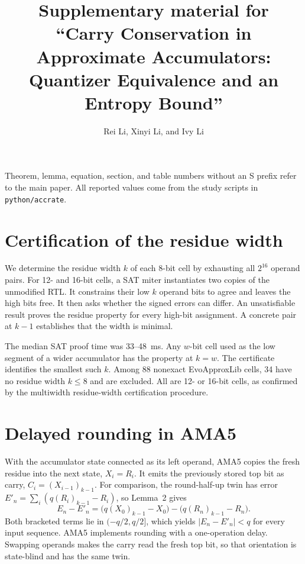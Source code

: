 \documentclass[11pt]{article}
\title{Supplementary material for\\``Carry Conservation in Approximate Accumulators:\\Quantizer Equivalence and an Entropy Bound''}
\author{Rei Li, Xinyi Li, and Ivy Li}
\date{}
\begin{document}
\maketitle

\noindent Theorem, lemma, equation, section, and table numbers without an
S prefix refer to the main paper. All reported values come from the
study scripts in \texttt{python/accrate}.

\section{Certification of the residue width}

We determine the residue width $k$ of each 8-bit cell by exhausting all
$2^{16}$ operand pairs. For 12- and 16-bit cells, a SAT miter instantiates
two copies of the unmodified RTL. It constrains their low $k$ operand bits
to agree and leaves the high bits free. It then asks whether the signed
errors can differ. An unsatisfiable result proves the residue property
for every high-bit assignment. A concrete pair at $k-1$ establishes
that the width is minimal.

The median SAT proof time was 33--48~ms. Any $w$-bit cell used as the
low segment of a wider accumulator has the property at $k=w$.
The certificate identifies the smallest such $k$. Among 88 nonexact
EvoApproxLib cells, 34 have no residue width $k\le8$ and are excluded.
All are 12- or 16-bit cells, as confirmed by the multiwidth residue-width
certification procedure.

\section{Delayed rounding in AMA5}

With the accumulator state connected as its left operand, AMA5 copies
the fresh residue into the next state, $X_i=R_i$. It emits the
previously stored top bit as carry, $C_i=(X_{i-1})_{k-1}$.
For comparison, the
round-half-up twin has error $E'_n=\sum_i(q(R_i)_{k-1}-R_i)$, so Lemma~2 gives
\begin{equation}
E_n-E'_n=\bigl(q(X_0)_{k-1}-X_0\bigr)-\bigl(q(R_n)_{k-1}-R_n\bigr).
\end{equation}
Both bracketed terms lie in $(-q/2,q/2]$, which yields
$|E_n-E'_n|<q$ for every input sequence. AMA5 implements rounding
with a one-operation delay. Swapping operands makes the carry read the fresh
top bit, so that orientation is state-blind and has the same twin.
\end{document}
